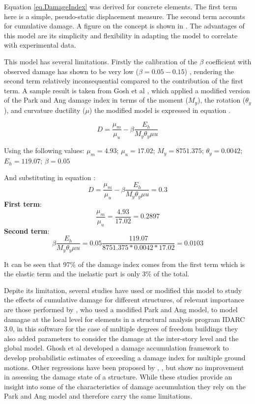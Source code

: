 Equation \ref{eq.DamageIndex} was derived for concrete elements. The first term here is a simple, pseudo-static displacement measure. The second term accounts for cumulative damage. A figure on the concept is shown in . The advantages of this model are its simplicity and flexibility in adapting the model to correlate with experimental data.  

This model has several limitations. Firstly the calibration of the $\beta$ coefficient with observed damage has shown to be very low ($\beta=0.05-0.15$) \cite{Young-JiPark1985} \cite{Ghosh2015}, rendering the second term relatively inconsequential compared to the contribution of the first term. A sample result is taken from Gosh et al \cite{Ghosh2015}, which applied a modified version of the Park and Ang damage index in terms of the moment ($M_{y}$), the rotation ($\theta_y$), and curvature ductility ($\mu$) the modified model is expressed in equation .

\begin{equation}
	D=\frac{\mu_{m}}{\mu_{u}}-\beta\frac{E_h}{M_{y}\theta_y\mu{u}}
	\label{eq.DamageIndexGhosh}
\end{equation}

Using the following values: $\mu_{m}=4.93$; $\mu_{u}=17.02$; $M_{y}=8751.375$; $\theta_y=0.0042$; $E_{h}=119.07$; $\beta=0.05$ 

And substituting in equation :
\[
 D=\frac{\mu_{m}}{\mu_{u}}-\beta\frac{E_h}{M_{y}\theta_y\mu{u}}=0.3
	\]
\textbf{First term}:
\[
\frac{\mu_{m}}{\mu_{u}}=\frac{4.93}{17.02}=0.2897
\]
\textbf{Second term}: 
\[	
	\beta \frac{E_h}{M_{y}\theta_y\mu{u}}=0.05\frac{119.07}{8751.375*0.0042*17.02}=0.0103
\]

It can be seen that 97\% of the damage index comes from the first term which is the elastic term and the inelastic part is only 3\% of the total. 

Depite its limitation, several studies have used or modified this model to study the effects of cumulative damage for different structures,  of relevant importance are those performed by \cite{Kunnath1992}, who used a modified Park and Ang model, to model damagae at the local level for elements in a structural analysis program IDARC 3.0, in this software for the case of multiple degrees of freedom buildings they also added parameters to consider the damage at the inter-story level and the global model. Ghosh et al \cite{Ghosh2015} developed a damage accumulation framework to develop probabilistic estimates of exceeding a damage index for multiple ground motions. Other regressions have been proposed by \cite{Khashaee}, \cite{Fajfar1992}, \cite{Roufaiel} but show no improvement in assessing the damage state of a structure. While these studies provide an insight into some of the characteristics of damage accumulation they rely on the Park and Ang model and therefore carry the same limitations.

